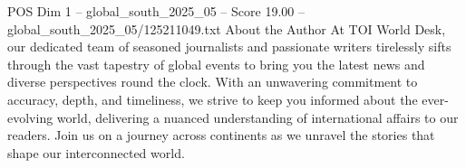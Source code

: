 \begin{textsample}{POS Dim 1 – global\_south\_2025\_05 – Score 19.00 – global\_south\_2025\_05/125211049.txt}
About the Author At TOI World Desk, our dedicated team of seasoned journalists and passionate writers tirelessly sifts through the vast tapestry of global events to bring you the latest news and diverse perspectives round the clock.
With an unwavering commitment to accuracy, depth, and timeliness, we strive to keep you informed about the ever-evolving world, delivering a nuanced understanding of international affairs to our readers.
Join us on a journey across continents as we unravel the stories that shape our interconnected world.

\end{textsample}
